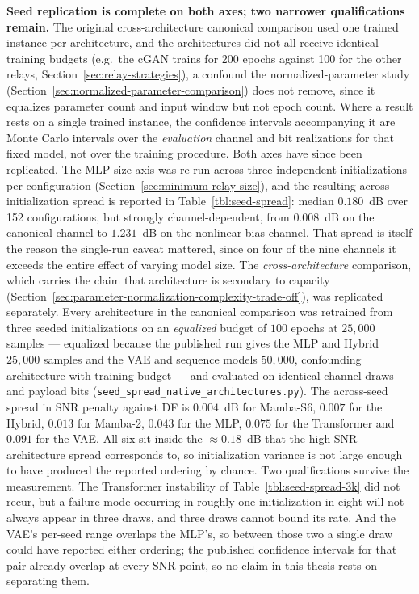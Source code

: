 \begin{enumerate}
  \textbf{Seed replication is complete on both axes; two narrower qualifications remain.} The original cross-architecture canonical comparison used one trained instance per architecture, and the architectures did not all receive identical training budgets (e.g.\ the cGAN trains for 200 epochs against 100 for the other relays, Section~\ref{sec:relay-strategies}), a confound the normalized-parameter study (Section~\ref{sec:normalized-parameter-comparison}) does not remove, since it equalizes parameter count and input window but not epoch count. Where a result rests on a single trained instance, the confidence intervals accompanying it are Monte Carlo intervals over the \emph{evaluation} channel and bit realizations for that fixed model, not over the training procedure. Both axes have since been replicated. The MLP size axis was re-run across three independent initializations per configuration (Section~\ref{sec:minimum-relay-size}), and the resulting across-initialization spread is reported in Table~\ref{tbl:seed-spread}: median $0.180$~dB over 152 configurations, but strongly channel-dependent, from $0.008$~dB on the canonical channel to $1.231$~dB on the nonlinear-bias channel. That spread is itself the reason the single-run caveat mattered, since on four of the nine channels it exceeds the entire effect of varying model size. The \emph{cross-architecture} comparison, which carries the claim that architecture is secondary to capacity (Section~\ref{sec:parameter-normalization-complexity-trade-off}), was replicated separately. Every architecture in the canonical comparison was retrained from three seeded initializations on an \emph{equalized} budget of $100$ epochs at $25{,}000$ samples --- equalized because the published run gives the MLP and Hybrid $25{,}000$ samples and the VAE and sequence models $50{,}000$, confounding architecture with training budget --- and evaluated on identical channel draws and payload bits (\texttt{seed\_spread\_native\_architectures.py}). The across-seed spread in SNR penalty against DF is $0.004$~dB for Mamba-S6, $0.007$ for the Hybrid, $0.013$ for Mamba-2, $0.043$ for the MLP, $0.075$ for the Transformer and $0.091$ for the VAE. All six sit inside the ${\approx}0.18$~dB that the high-SNR architecture spread corresponds to, so initialization variance is not large enough to have produced the reported ordering by chance. Two qualifications survive the measurement. The Transformer instability of Table~\ref{tbl:seed-spread-3k} did not recur, but a failure mode occurring in roughly one initialization in eight will not always appear in three draws, and three draws cannot bound its rate. And the VAE's per-seed range overlaps the MLP's, so between those two a single draw could have reported either ordering; the published confidence intervals for that pair already overlap at every SNR point, so no claim in this thesis rests on separating them.
\end{enumerate}

